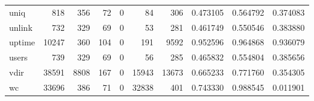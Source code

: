 \begin{longtable}{lrrrrrrrrr}
uniq      &                                                818 &                                                356 &                                                 72 &                                                  0 &                                                 84 &                                                306 &                                           0.473105 &                               0.564792 &                             0.374083 \\
unlink    &                                                732 &                                                329 &                                                 69 &                                                  0 &                                                 53 &                                                281 &                                           0.461749 &                               0.550546 &                             0.383880 \\
uptime    &                                              10247 &                                                360 &                                                104 &                                                  0 &                                                191 &                                               9592 &                                           0.952596 &                               0.964868 &                             0.936079 \\
users     &                                                739 &                                                329 &                                                 69 &                                                  0 &                                                 56 &                                                285 &                                           0.465832 &                               0.554804 &                             0.385656 \\
vdir      &                                              38591 &                                               8808 &                                                167 &                                                  0 &                                              15943 &                                              13673 &                                           0.665233 &                               0.771760 &                             0.354305 \\
wc        &                                              33696 &                                                386 &                                                 71 &                                                  0 &                                              32838 &                                                401 &                                           0.743330 &                               0.988545 &                             0.011901 \\

\end{longtable}
